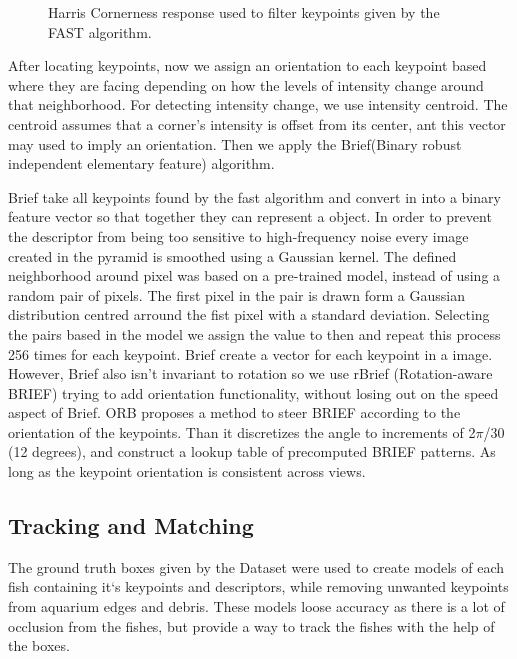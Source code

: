 \documentclass[conference]{IEEEtran}
\begin{document}
\begin{figure}[h]
    \centering
    \caption{Harris Cornerness response used to filter keypoints given by the FAST algorithm.}
    \label{fig:harris}
\end{figure}

After locating keypoints, now we assign an orientation to each keypoint based where they are facing depending on how the levels of intensity change around that neighborhood. For detecting intensity change, we use intensity centroid. The centroid assumes that a corner's intensity is offset from its center, ant this vector may used to imply an orientation. Then we apply the Brief(Binary robust independent elementary feature) algorithm.

Brief take all keypoints found by the fast algorithm and convert in into a binary feature vector so that together they can represent a object. In order to prevent the descriptor from being too sensitive to high-frequency noise every image created in the pyramid is smoothed using a Gaussian kernel. The defined neighborhood around pixel was based on a pre-trained model, instead of using a random pair of pixels. The first pixel in the pair is drawn form a Gaussian distribution centred arround the fist pixel with a standard deviation. Selecting the pairs based in the model we assign the value to then and repeat this process 256 times for each keypoint. Brief create a vector for each keypoint in a image. However, Brief also isn't invariant to rotation so we use rBrief (Rotation-aware BRIEF) trying to add orientation functionality, without losing out on the speed aspect of Brief. ORB proposes a method to steer BRIEF according to the orientation of the keypoints. Than it discretizes the angle to increments of 2$\pi$/30 (12 degrees), and construct a lookup table of precomputed BRIEF patterns. As long as the keypoint orientation is consistent across views.  

\subsection{Tracking and Matching}
The ground truth boxes given by the Dataset were used to create models of each fish containing it`s keypoints and descriptors, while removing unwanted keypoints from aquarium edges and debris. These models loose accuracy as there is a lot of occlusion from the fishes, but provide a way to track the fishes with the help of the boxes.
\end{document}
